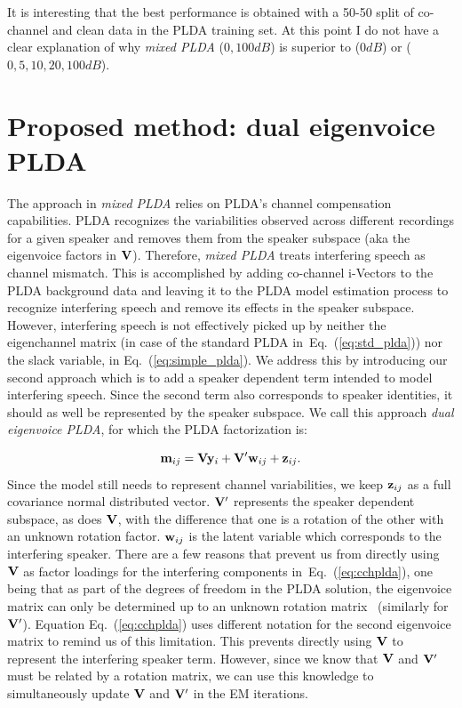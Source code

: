 \newpage
It is interesting that the best performance is obtained with a 50-50 split of co-channel and clean data in the PLDA training set. 
At this point I do not have a clear explanation of why {\it mixed PLDA} ($0,100dB$) is superior to ($0dB$) or ($0,5,10,20,100dB$). 

\section{Proposed method: dual eigenvoice PLDA}
\label{sec:dualev_plda}

The approach in {\it mixed PLDA} relies on PLDA's channel compensation capabilities. 
PLDA recognizes the variabilities observed across different recordings for a given speaker and removes them from the speaker subspace (aka the eigenvoice factors in ${\bf V}$). 
Therefore, {\it mixed PLDA} treats interfering speech as channel mismatch. 
This is accomplished by adding co-channel i-Vectors to the PLDA background data and leaving it to the PLDA model estimation process to recognize interfering speech and remove its effects in the speaker subspace. 
However, interfering speech is not effectively picked up by neither the eigenchannel matrix (in case of the standard PLDA in~Eq.~(\ref{eq:std_plda})) nor the slack variable, in Eq.~(\ref{eq:simple_plda}). 
We address this by introducing our second approach which is to add a speaker dependent term intended to model interfering speech. Since the second term also corresponds to speaker identities, it should as well be represented by the speaker subspace. 
We call this approach {\it dual eigenvoice PLDA}, for which the PLDA factorization is: 

\begin{equation}
\label{eq:cchplda}
{\bf m}_{ij} = {\bf V}{\bf y}_i+{\bf V}^\prime {\bf w}_{ij}+{\bf z}_{ij}.
\end{equation}
Since the model still needs to represent channel variabilities, we keep ${\bf z}_{ij}$ as a full covariance normal distributed vector. 
${\bf V}^\prime$ represents the speaker dependent subspace, as does ${\bf V}$, with the difference that one is a rotation of the other with an unknown rotation factor. 
${\bf w}_{ij}$ is the latent variable which corresponds to the interfering speaker. 
There are a few reasons that prevent us from directly using ${\bf V}$ as factor loadings for the interfering components in~Eq.~(\ref{eq:cchplda}), one being that as part of the degrees of freedom in the PLDA solution, the eigenvoice matrix can only be determined up to an unknown rotation matrix~\cite{sizov2014unifying} (similarly for ${\bf V}^\prime$). 
Equation Eq.~(\ref{eq:cchplda}) uses different notation for the second eigenvoice matrix to remind us of this limitation. 
This prevents directly using ${\bf V}$ to represent the interfering speaker term. However, since we know that ${\bf V}$ and ${\bf V}^\prime$ must be related by a rotation matrix, we can use this knowledge to simultaneously update ${\bf V}$ and ${\bf V}^\prime$ in the EM iterations. 

